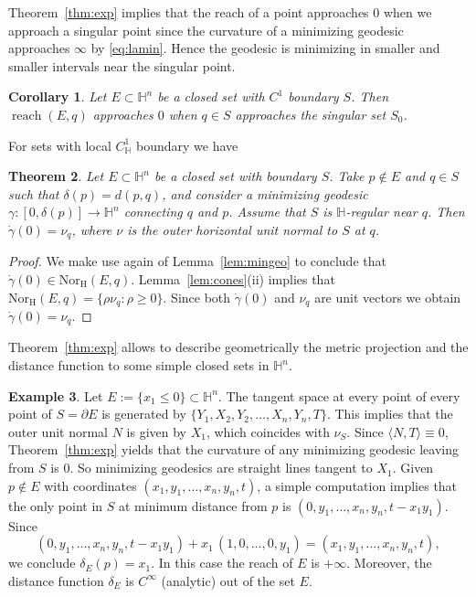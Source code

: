 \documentclass[10pt]{amsart}
\newtheorem{theorem}{Theorem}[section]
\newtheorem{corollary}[theorem]{Corollary}
\theoremstyle{definition}
\newtheorem{example}[theorem]{Example}
\theoremstyle{remark}
\numberwithin{equation}{section}
\begin{document}
Theorem~\ref{thm:exp} implies that the reach of a point approaches $0$ when we approach a singular point since the curvature of a minimizing geodesic approaches $\infty$ by \eqref{eq:lamin}. Hence the geodesic is minimizing in smaller and smaller intervals near the singular point.

\begin{corollary}
\label{cor:reach0}
Let $E\subset{{\mathbb{H}}}^n$ be a closed set with $C^{1}$ boundary $S$. Then $\operatorname{reach}(E,q)$ approaches $0$ when $q\in S$ approaches the singular set $S_{0}$.
\end{corollary}

For sets with local $C_{{\mathbb{H}}}^1$ boundary we have

\begin{theorem}
\label{thm:ch1exp}
Let $E\subset{{\mathbb{H}}}^n$ be a closed set with boundary $S$. Take $p\not\in E$ and $q\in S$ such that $\delta(p)=d(p,q)$, and consider a minimizing geodesic ${\gamma}:[0,\delta(p)]\to{{\mathbb{H}}}^n$ connecting $q$ and $p$. Assume that $S$ is ${{\mathbb{H}}}$-regular near $q$. Then ${\dot{\gamma}}(0)=\nu_q$, where $\nu$ is the outer horizontal unit normal to $S$ at $q$.
\end{theorem}

\begin{proof}
We make use again of Lemma~\ref{lem:mingeo} to conclude that ${\dot{\gamma}}(0)\in\operatorname{Nor_{H}}(E,q)$. Lemma~\ref{lem:cones}(ii) implies that $\operatorname{Nor_{H}}(E,q)=\{\rho \nu_q:\rho{\geqslant} 0\}$. Since both ${\dot{\gamma}}(0)$ and $\nu_q$ are unit vectors we obtain ${\dot{\gamma}}(0)=\nu_q$.
\end{proof}

Theorem~\ref{thm:exp} allows to describe geometrically  the metric projection and the distance function to some simple closed sets in ${{\mathbb{H}}}^n$.

\begin{example}
\label{ex:vertplane}
Let $E:=\{x_1{\leqslant} 0\}\subset{{\mathbb{H}}}^n$. The tangent space at every point of every point of $S={\partial} E$ is generated by $\{Y_1,X_2,Y_2,\ldots,X_n,Y_n,T\}$. This implies that the outer unit normal $N$ is given by $X_1$, which coincides with $\nu_S$. Since ${\langle{N,T}\rangle}\equiv 0$, Theorem~\ref{thm:exp} yields that the curvature of any minimizing geodesic leaving from $S$ is $0$. So minimizing geodesics are straight lines tangent to $X_1$. Given $p\not\in E$ with coordinates $(x_1,y_1,\ldots,x_n,y_n,t)$, a simple computation implies that the only point in $S$ at minimum distance from $p$ is $(0,y_1,\ldots,x_n,y_n,t-x_1y_1)$. Since
\[
(0,y_1,\ldots,x_n,y_n,t-x_1y_1)+x_1\,(1,0,\ldots,0,y_1)=(x_1,y_1,\ldots,x_n,y_n,t),
\]
we conclude $\delta_E(p)=x_1$. In this case the reach of $E$ is $+\infty$. Moreover, the distance function $\delta_E$ is $C^\infty$ (analytic) out of the set $E$.
\end{example}
\end{document}
